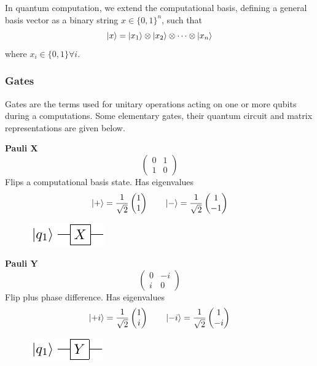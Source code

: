 \documentclass[11pt]{article}
\begin{document}
In quantum computation, we extend the computational basis, defining a general basis vector as a binary string $x\in \{0,1\}^{n}$, such that
\begin{equation}
\ket{x} = \ket{x_{1}}\otimes \ket{x_{2}} \otimes \cdots \otimes\ket{x_n}
\end{equation}
where $x_{i}\in\{0,1\}\forall i$.

\subsubsection*{Gates}
Gates are the terms used for unitary operations acting on one or more qubits during a computations. Some elementary gates, their quantum circuit and matrix representations are given below.

\textbf{Pauli X}
\[\begin{pmatrix}
0 & 1 \\
1 & 0
\end{pmatrix}\]
Flips a computational basis state. Has eigenvalues
\[\ket{+} = \frac{1}{\sqrt{2}}\begin{pmatrix}1\\1\end{pmatrix} \qquad
\ket{-} = \frac{1}{\sqrt{2}}\begin{pmatrix}1\\-1\end{pmatrix}
\]

\begin{figure}[h]
    \centering
    \includegraphics[width=.2\textwidth]{Circuits/X.pdf}
\end{figure}

\textbf{Pauli Y}
\[\begin{pmatrix}
0 & -i \\
i & 0
\end{pmatrix}\]
Flip plus phase difference. Has eigenvalues
\[\ket{+i} = \frac{1}{\sqrt{2}}\begin{pmatrix}1\\i\end{pmatrix} \qquad
\ket{-i} = \frac{1}{\sqrt{2}}\begin{pmatrix}1\\-i\end{pmatrix}
\]

\begin{figure}[h]
    \centering
    \includegraphics[width=.2\textwidth]{Circuits/Y.pdf}
\end{figure}
\end{document}
